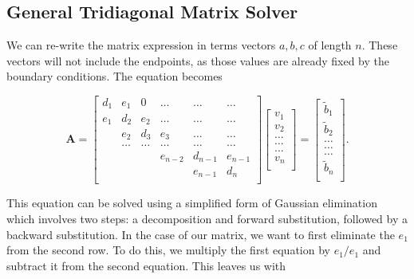 \documentclass[%
oneside,                 %
final,                   %
10pt]{article}
\begin{document}
\subsection{General Tridiagonal Matrix Solver}

We can re-write the matrix expression in terms vectors $a,b,c$ of length $n$.  These vectors will not include the endpoints, as those values are already fixed by the boundary conditions. The equation becomes

\[
    \mathbf{A} = \begin{bmatrix}
                           d_1& e_1 & 0 &\dots   & \dots &\dots \\
                           e_1 & d_2 & e_2 &\dots &\dots &\dots \\
                           & e_2 & d_3 & e_3 & \dots & \dots \\
                           & \dots   & \dots &\dots   &\dots & \dots \\
                           &   &  &e_{n-2}  &d_{n-1}& e_{n-1} \\
                           &    &  &   &e_{n-1} & d_n \\
                      \end{bmatrix}\begin{bmatrix}
                           v_1\\
                           v_2\\
                           \dots \\
                          \dots  \\
                          \dots \\
                           v_n\\
                      \end{bmatrix}
  =\begin{bmatrix}
                           \tilde{b}_1\\
                           \tilde{b}_2\\
                           \dots \\
                           \dots \\
                          \dots \\
                           \tilde{b}_n\\
                      \end{bmatrix}.
\]

This equation can be solved using a simplified form of Gaussian elimination which involves two steps: a decomposition and forward substitution, followed by a backward substitution.  In the case of our matrix, we want to first eliminate the $e_1$ from the second row.  To do this, we multiply the first equation by $e_1/e_1$ and subtract it from the second equation.  This leaves us with
\end{document}

